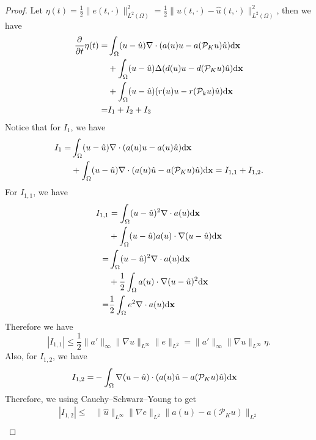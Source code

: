 \documentclass[preprint,12pt]{elsarticle}
\theoremstyle{definition}
\theoremstyle{remark}
\begin{document}
\begin{proof}
    Let $\eta(t) = \frac{1}{2}\|e(t,\cdot)\|^2_{L^2(\Omega)}  = \frac{1}{2}\|u(t,\cdot)-\hat u(t,\cdot)\|^2_{L^2(\Omega)} $, then we have 
    \begin{equation}
        \begin{aligned}
    \frac{\partial}{\partial t} \eta(t)
        = & \int_\Omega (u-\hat{u})\nabla \cdot (a(u)u - a(\mathcal P_K u )\hat u )\mathrm{d} \mathbf{x} \\
        & + \int_\Omega (u-\hat{u})  \Delta (d(u)u - d(\mathcal P_K u )\hat u  )\mathrm{d} \mathbf{x} \\
        & + \int_\Omega (u-\hat{u})  (r(u)u - r(\mathcal P_k  u )\hat u) \mathrm{d} \mathbf{x}  \\
        = &  I_1 + I_2 + I_3
        \end{aligned}
    \end{equation}
Notice that for $I_1$, we have
\[
\begin{aligned}
    I_1 =& \int_\Omega (u-\hat{u})\nabla \cdot (a(u)u - a(u)\hat u )\mathrm{d} \mathbf{x} \\
    &+ \int_\Omega (u-\hat{u})\nabla \cdot (a(u)\hat u - a(\mathcal P_K u )\hat u )\mathrm{d} \mathbf{x} = I_{1,1}+ I_{1,2}.\\
\end{aligned}
\]
For $I_{1,1}$, we have
\[
\begin{aligned}
    I_{1,1} & = \int_\Omega (u-\hat{u})^2\nabla \cdot a(u)\mathrm{d} \mathbf{x} \\
    & +  \int_\Omega (u-\hat{u})a(u)\cdot\nabla (u-\hat{u}) \mathrm{d} \mathbf{x} \\
    = &  \int_\Omega (u-\hat{u})^2\nabla \cdot a(u)\mathrm{d} \mathbf{x} \\
    & +  \frac{1}{2}\int_\Omega a(u)\cdot\nabla (u-\hat{u})^2 \mathrm{d} \mathbf{x} \\
   = & \frac{1}{2}\int_\Omega e^2\nabla \cdot a(u)\mathrm{d} \mathbf{x}
    \end{aligned}
\]
Therefore we have\[
|I_{1,1}|  
    \leq \frac{1}{2}\|a'\|_{\infty}\|\nabla u \|_{L^\infty}\|e\|_{L^2} = \|a'\|_{\infty}\|\nabla u \|_{L^\infty} \eta.
\]
Also, for $I_{1,2}$, we have 
\[
\begin{aligned}
    I_{1,2} = & - \int_\Omega \nabla (u-\hat{u}) \cdot (a(u)\hat u - a(\mathcal P_K u )\hat u )\mathrm{d} \mathbf{x}
\end{aligned}
\]
Therefore, we using Cauchy–Schwarz–Young to get 
\[
\begin{aligned}
|I_{1,2}| \leq& \|\hat u \|_{L^\infty} \|\nabla e \|_{L^2}\|a(u) - a(\mathcal P_K u )\|_{L^2}\\

\end{aligned}\]
\end{proof}
\end{document}
